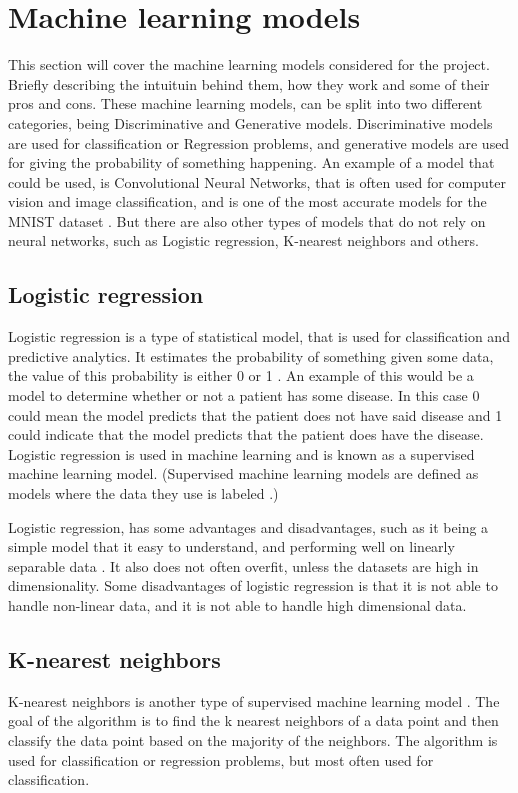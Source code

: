 \section{Machine learning models}\label{sec:machine-learning-models}
This section will cover the machine learning models considered for the project. Briefly describing the intuituin behind them, how they work and some of their pros and cons. These machine learning models, can be split into two different categories, being Discriminative and Generative models. Discriminative models are used for classification or Regression problems, and generative models are used for giving the probability of something happening. An example of a model that could be used, is Convolutional Neural Networks, that is often used for computer vision and image classification, and is one of the most accurate models for the MNIST dataset \cite{MnistStatictics}. But there are also other types of models that do not rely on neural networks, such as Logistic regression, K-nearest neighbors and others.

\subsection{Logistic regression}
Logistic regression is a type of statistical model, that is used for classification and predictive analytics. It estimates the probability of something given some data, the value of this probability is either 0 or 1 \cite{WhatIsLogisticRegression}. An example of this would be a model to determine whether or not a patient has some disease. In this case 0 could mean the model predicts that the patient does not have said disease and 1 could indicate that the model predicts that the patient does have the disease. Logistic regression is used in machine learning and is known as a supervised machine learning model. (Supervised machine learning models are defined as models where the data they use is labeled \cite{SupervisedLearning}.)

Logistic regression, has some advantages and disadvantages, such as it being a simple model that it easy to understand, and performing well on linearly separable data \cite{LogisticRegressionProsAndCons}. It also does not often overfit, unless the datasets are high in dimensionality. Some disadvantages of logistic regression is that it is not able to handle non-linear data, and it is not able to handle high dimensional data.

\subsection{K-nearest neighbors}
K-nearest neighbors is another type of supervised machine learning model \cite{K-NearestNeighborsIBM}. The goal of the algorithm is to find the k nearest neighbors of a data point and then classify the data point based on the majority of the neighbors. The algorithm is used for classification or regression problems, but most often used for classification.


